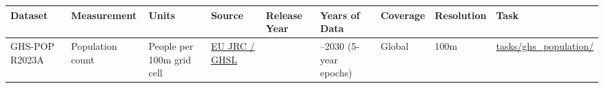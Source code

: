 \documentclass[
  letterpaper,
  DIV=11,
  numbers=noendperiod]{scrreprt}
\newcounter{none} %
\begin{document}
{\def\LTcaptype{none} %
\begin{longtable}[]{@{}
  >{\raggedright\arraybackslash}p{}
  >{\raggedright\arraybackslash}p{}
  >{\raggedright\arraybackslash}p{}
  >{\raggedright\arraybackslash}p{}
  >{\raggedright\arraybackslash}p{}
  >{\raggedright\arraybackslash}p{}
  >{\raggedright\arraybackslash}p{}
  >{\raggedright\arraybackslash}p{}
  >{\raggedright\arraybackslash}p{}@{}}
\toprule\noalign{}
\begin{minipage}[b]{\linewidth}\raggedright
Dataset
\end{minipage} & \begin{minipage}[b]{\linewidth}\raggedright
Measurement
\end{minipage} & \begin{minipage}[b]{\linewidth}\raggedright
Units
\end{minipage} & \begin{minipage}[b]{\linewidth}\raggedright
Source
\end{minipage} & \begin{minipage}[b]{\linewidth}\raggedright
Release Year
\end{minipage} & \begin{minipage}[b]{\linewidth}\raggedright
Years of Data
\end{minipage} & \begin{minipage}[b]{\linewidth}\raggedright
Coverage
\end{minipage} & \begin{minipage}[b]{\linewidth}\raggedright
Resolution
\end{minipage} & \begin{minipage}[b]{\linewidth}\raggedright
Task
\end{minipage} \\
\midrule\noalign{}
\endhead
\bottomrule\noalign{}
\endlastfoot
GHS-POP R2023A & Population count & People per 100m grid cell &
\href{https://ghsl.jrc.ec.europa.eu/ghs_pop2023.php}{EU JRC / GHSL} &
2023 & 1975--2030 (5-year epochs) & Global & 100m &
\href{../tasks/ghs_population/}{tasks/ghs\_population/} \\
\end{longtable}
}
\end{document}
